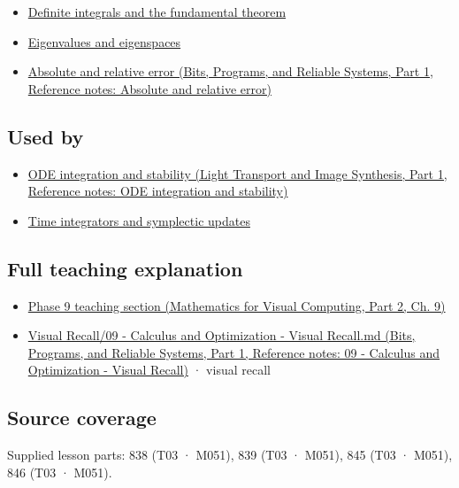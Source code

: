 \begin{itemize}
\tightlist
\item
  \hyperref[appendix-1a50e72435c2]{Definite integrals and the fundamental theorem}
\item
  \hyperref[appendix-0b3be18411f9]{Eigenvalues and eigenspaces}
\item
  \href{../01-Bits-Programs-and-Reliable-Systems-P01/main.pdf\#nameddest=appendix-3ae74e89b4e6}{Absolute and relative error (Bits, Programs, and Reliable Systems, Part 1, Reference notes: Absolute and relative error)}
\end{itemize}

\subsection{Used by}\label{appendix-e8ab9836882e-used-by}

\hypertarget{appendix-e8ab9836882e-used-by}{}

\begin{itemize}
\tightlist
\item
  \href{../04-Light-Transport-and-Image-Synthesis-P01/main.pdf\#nameddest=appendix-18eacf61a04b}{ODE integration and stability (Light Transport and Image Synthesis, Part 1, Reference notes: ODE integration and stability)}
\item
  \hyperref[appendix-8f96f9c4d5bc]{Time integrators and symplectic updates}
\end{itemize}

\subsection{Full teaching explanation}\label{appendix-e8ab9836882e-full-teaching-explanation}

\hypertarget{appendix-e8ab9836882e-full-teaching-explanation}{}

\begin{itemize}
\tightlist
\item
  \href{../02-Mathematics-for-Visual-Computing-P02/main.pdf\#nameddest=02-foundations-ii-ch025-odes-and-numerical-simulation}{Phase 9 teaching section (Mathematics for Visual Computing, Part 2, Ch. 9)}
\item
  \href{../01-Bits-Programs-and-Reliable-Systems-P01/main.pdf\#nameddest=appendix-adf48f5dc5c1}{Visual Recall/09 - Calculus and Optimization - Visual Recall.md (Bits, Programs, and Reliable Systems, Part 1, Reference notes: 09 - Calculus and Optimization - Visual Recall)} · visual recall
\end{itemize}

\subsection{Source coverage}\label{appendix-e8ab9836882e-source-coverage}

\hypertarget{appendix-e8ab9836882e-source-coverage}{}

Supplied lesson parts: 838 (T03 · M051), 839 (T03 · M051), 845 (T03 · M051), 846 (T03 · M051).
